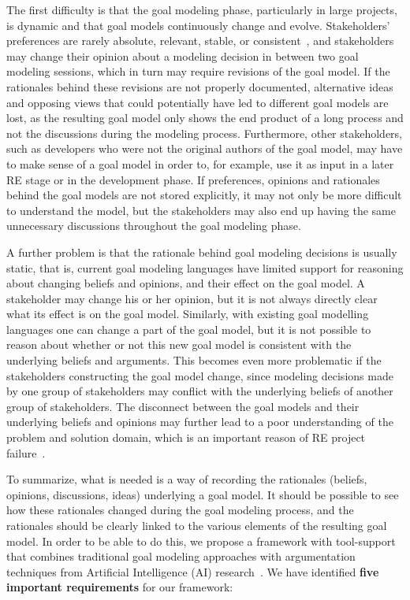 
The first difficulty is that the goal modeling phase, particularly in large projects, is dynamic and that goal models continuously change and evolve. Stakeholders' preferences are rarely absolute, relevant, stable, or consistent~\cite{march1978bounded}, and stakeholders may change their opinion about a modeling decision in between two goal modeling sessions, which in turn may require revisions of the goal model. If the rationales behind these revisions are not properly documented, alternative ideas and opposing views that could potentially have led to different goal models are lost, as the resulting goal model only shows the end product of a long process and not the discussions during the modeling process. Furthermore, other stakeholders, such as developers who were not the original authors of the goal model, may have to make sense of a goal model in order to, for example, use it as input in a later RE stage or in the development phase. If preferences, opinions and rationales behind the goal models are not stored explicitly, it may not only be more difficult to understand the model, but the stakeholders may also end up having the same unnecessary discussions throughout the goal modeling phase.

A further problem is that the rationale behind goal modeling decisions is usually static, that is, current goal modeling languages have limited support for reasoning about changing beliefs and opinions, and their effect on the goal model. A stakeholder may change his or her opinion, but it is not always directly clear what its effect is on the goal model. Similarly, with existing goal modelling languages one can change a part of the goal model, but it is not possible to reason about whether or not this new goal model is consistent with the underlying beliefs and arguments. This becomes even more problematic if the stakeholders constructing the goal model change, since modeling decisions made by one group of stakeholders may conflict with the underlying beliefs of another group of stakeholders. The disconnect between the goal models and their underlying beliefs and opinions may further lead to a poor understanding of the problem and solution domain, which is an important reason of RE project failure~\cite{curtis1988field}. 

To summarize, what is needed is a way of recording the rationales (beliefs, opinions, discussions, ideas) underlying a goal model. It should be possible to see how these rationales changed during the goal modeling process, and the rationales should be clearly linked to the various elements of the resulting goal model. In order to be able to do this, we propose a framework with tool-support that combines traditional goal modeling approaches with argumentation techniques from Artificial Intelligence (AI) research~\cite{BenchCaponDunne2007}. We have identified \textbf{five important requirements} for our framework: 

